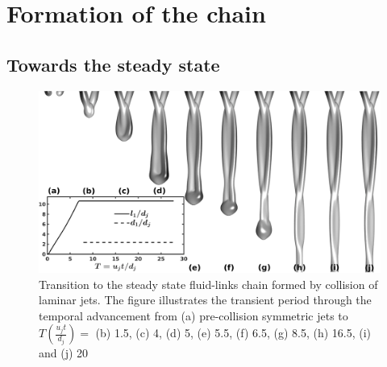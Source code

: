 \documentclass[%
aip,
sd,%
amsmath,amssymb,
preprint,%
author-year,%
]{revtex4-1}
\begin{document}
\section{Formation of the chain}
\lipsum[1]
\subsection{Towards the steady state}

\begin{figure}[H]
	\centering
	\includegraphics[width=\linewidth]{fig0}
	\caption{Transition to the steady state fluid-links chain formed by collision of laminar jets. The figure illustrates the transient period through the temporal advancement from (a) pre-collision symmetric jets to $T (\frac{u_jt}{d_j}) = $ (b) 1.5, (c) 4, (d) 5, (e) 5.5, (f) 6.5, (g) 8.5, (h) 16.5, (i) and (j) 20}
	\label{Figure::transient}
\end{figure}
\lipsum[1]
\end{document}
